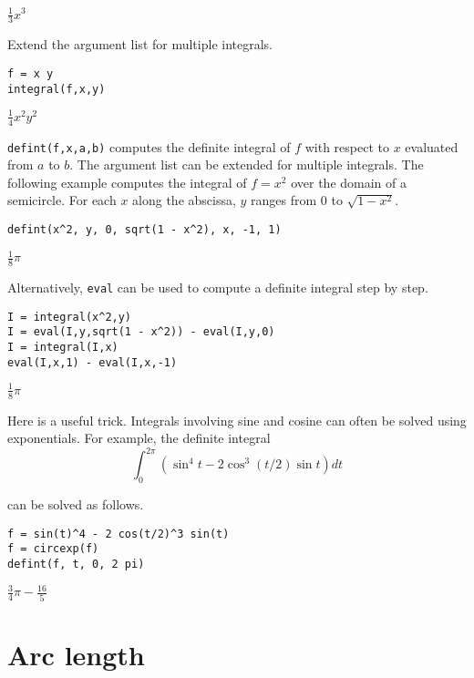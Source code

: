 \documentclass[12pt]{article}
\begin{document}
$\displaystyle \tfrac{1}{3}x^3$

\bigskip
Extend the argument list for multiple integrals.

{\color{blue}
\begin{verbatim}
f = x y
integral(f,x,y)
\end{verbatim}
}

$\displaystyle \tfrac{1}{4}x^2y^2$

\bigskip
\verb$defint(f,x,a,b)$
computes the definite integral of $f$ with respect to $x$ evaluated from
$a$ to $b$.
The argument list can be extended for multiple integrals.
The following example computes the integral of $f=x^2$
over the domain of a semicircle.
For each $x$ along the abscissa, $y$ ranges from 0 to $\sqrt{1-x^2}$.

{\color{blue}
\begin{verbatim}
defint(x^2, y, 0, sqrt(1 - x^2), x, -1, 1)
\end{verbatim}
}

$\displaystyle \tfrac{1}{8}\pi$

\bigskip
Alternatively, \verb$eval$ can be used to compute a definite integral step by step.

{\color{blue}
\begin{verbatim}
I = integral(x^2,y)
I = eval(I,y,sqrt(1 - x^2)) - eval(I,y,0)
I = integral(I,x)
eval(I,x,1) - eval(I,x,-1)
\end{verbatim}
}

$\displaystyle \tfrac{1}{8}\pi$

\bigskip
Here is a useful trick.
Integrals involving sine and cosine
can often be solved using exponentials.
For example, the definite integral
\begin{equation*}
\int_0^{2\pi}\left(\sin^4t-2\cos^3(t/2)\sin t\right)dt
\end{equation*}

can be solved as follows.

{\color{blue}
\begin{verbatim}
f = sin(t)^4 - 2 cos(t/2)^3 sin(t)
f = circexp(f)
defint(f, t, 0, 2 pi)
\end{verbatim}
}

$\displaystyle \tfrac{3}{4}\pi-\tfrac{16}{5}$

\newpage

\section{Arc length}
\end{document}
